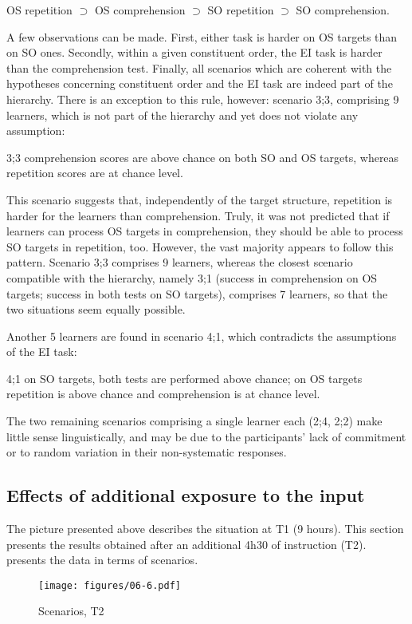 OS repetition ${\supset}$ OS comprehension ${\supset}$ SO repetition ${\supset}$ SO comprehension. 

A few observations can be made. First, either task is harder on OS targets than on SO ones. Secondly, within a given constituent order, the EI task is harder than the comprehension test. Finally, all scenarios which are coherent with the hypotheses concerning constituent order and the EI task are indeed part of the hierarchy. There is an exception to this rule, however: scenario 3;3, comprising 9 learners, which is not part of the hierarchy and yet does not violate any assumption:

3;3  comprehension scores are above chance on both SO and OS targets, whereas repetition scores are at chance level. 

This scenario suggests that, independently of the target structure, repetition is harder for the learners than comprehension. Truly, it was not predicted that if learners can process OS targets in comprehension, they should be able to process SO targets in repetition, too. However, the vast majority appears to follow this pattern. Scenario 3;3 comprises 9 learners, whereas the closest scenario compatible with the hierarchy, namely 3;1 (success in comprehension on OS targets; success in both tests on SO targets), comprises 7 learners, so that the two situations seem equally possible. 

Another 5 learners are found in scenario 4;1, which contradicts the assumptions of the EI task: 

4;1  on SO targets, both tests are performed above chance; on OS targets repetition is above chance and comprehension is at chance level. 

The two remaining scenarios comprising a single learner each (2;4, 2;2) make little sense linguistically, and may be due to the participants’ lack of commitment or to random variation in their non-systematic responses. 

\subsection{Effects of additional exposure to the input}\label{sec:06:3.1}

The picture presented above describes the situation at T1 (9 hours). This section presents the results obtained after an additional 4h30 of instruction (T2).  presents the data in terms of scenarios.

\begin{figure}
    \texttt{[image: figures/06-6.pdf]}
    \caption{Scenarios, T2}
    \label{fig:06:6}
\end{figure}

